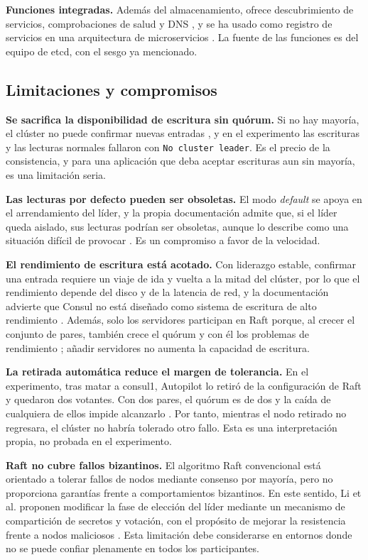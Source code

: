 \documentclass[12pt,a4paper]{article}
\begin{document}
\textbf{Funciones integradas.} Además del almacenamiento, ofrece descubrimiento de servicios,
comprobaciones de salud y DNS \cite{etcd_why}, y se ha usado como registro de servicios en una
arquitectura de microservicios \cite{rodrigues2025stress}. La fuente de las funciones es del
equipo de etcd, con el sesgo ya mencionado.

\subsection{Limitaciones y compromisos}

\textbf{Se sacrifica la disponibilidad de escritura sin quórum.} Si no hay mayoría, el clúster no
puede confirmar nuevas entradas \cite{consul_consensus}, y en el experimento las escrituras y las
lecturas normales fallaron con \texttt{No cluster leader}. Es el precio de la consistencia, y
para una aplicación que deba aceptar escrituras aun sin mayoría, es una limitación seria.

\textbf{Las lecturas por defecto pueden ser obsoletas.} El modo \textit{default} se apoya en el
arrendamiento del líder, y la propia documentación admite que, si el líder queda aislado, sus
lecturas podrían ser obsoletas, aunque lo describe como una situación difícil de provocar
\cite{consul_consensus}. Es un compromiso a favor de la velocidad.

\textbf{El rendimiento de escritura está acotado.} Con liderazgo estable, confirmar una entrada
requiere un viaje de ida y vuelta a la mitad del clúster, por lo que el rendimiento depende del
disco y de la latencia de red, y la documentación advierte que Consul no está diseñado como
sistema de escritura de alto rendimiento \cite{consul_consensus}. Además, solo los servidores
participan en Raft porque, al crecer el conjunto de pares, también crece el quórum y con él los
problemas de rendimiento \cite{consul_consensus}; añadir servidores no aumenta la capacidad de
escritura.

\textbf{La retirada automática reduce el margen de tolerancia.} En el experimento, tras matar a
consul1, Autopilot lo retiró de la configuración de Raft y quedaron dos votantes. Con dos pares,
el quórum es de dos y la caída de cualquiera de ellos impide alcanzarlo
\cite{consul_consensus}. Por tanto, mientras el nodo retirado no regresara, el clúster no habría
tolerado otro fallo. Esta es una interpretación propia, no probada en el experimento.

\textbf{Raft no cubre fallos bizantinos.}
El algoritmo Raft convencional está orientado a tolerar fallos de nodos mediante consenso por mayoría, pero no proporciona garantías frente a comportamientos bizantinos. En este sentido, Li et al. proponen modificar la fase de elección del líder mediante un mecanismo de compartición de secretos y votación, con el propósito de mejorar la resistencia frente a nodos maliciosos \cite{li2024mec}. Esta limitación debe considerarse en entornos donde no se puede confiar plenamente en todos los participantes.
\end{document}
